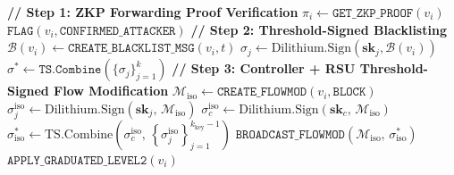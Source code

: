 \documentclass[12pt, a4paper]{report}
\begin{document}
\begin{algorithm}[!htbp]
\caption{Post-Quantum Cryptographic Mitigation and Node Isolation (\texttt{PQC-Mit})}
\begin{algorithmic}[1]
\small
{}
  \State \textbf{// Step 1: ZKP Forwarding Proof Verification}
  \State $\pi_i \gets \texttt{GET\_ZKP\_PROOF}(v_i)$
    \State $\texttt{FLAG}(v_i, \texttt{CONFIRMED\_ATTACKER})$
  \EndIf
  \State \textbf{// Step 2: Threshold-Signed Blacklisting}
  \State $\mathcal{B}(v_i) \gets \texttt{CREATE\_BLACKLIST\_MSG}(v_i, t)$
    \State $\sigma_j \gets \text{Dilithium.Sign}(\mathbf{sk}_j, \mathcal{B}(v_i))$
  \EndFor
  \State $\sigma^* \gets \texttt{TS.Combine}(\{\sigma_j\}_{j=1}^{k})$
    \State \textbf{// Step 3: Controller + RSU Threshold-Signed
      Flow Modification}
    \State $\mathcal{M}_{\text{iso}} \gets
      \texttt{CREATE\_FLOWMOD}(v_i, \texttt{BLOCK})$
      \State $\sigma_j^{\text{iso}} \gets
        \mathrm{Dilithium.Sign}
        (\mathbf{sk}_j,\, \mathcal{M}_{\text{iso}})$
    \EndFor
    \State $\sigma_c^{\text{iso}} \gets
      \mathrm{Dilithium.Sign}
      (\mathbf{sk}_c,\, \mathcal{M}_{\text{iso}})$
    \State $\sigma_{\text{iso}}^* \gets
      \mathrm{TS.Combine}\!\left(
      \sigma_c^{\text{iso}},\,
      \left\{\sigma_j^{\text{iso}}\right\}_{j=1}^{k_{\text{key}}-1}
      \right)$
      \State $\texttt{BROADCAST\_FLOWMOD}
        (\mathcal{M}_{\text{iso}},\, \sigma_{\text{iso}}^*)$
    \Else
      \State $\texttt{APPLY\_GRADUATED\_LEVEL2}(v_i)$
    \EndIf


\end{algorithmic}
\end{algorithm}
\end{document}
